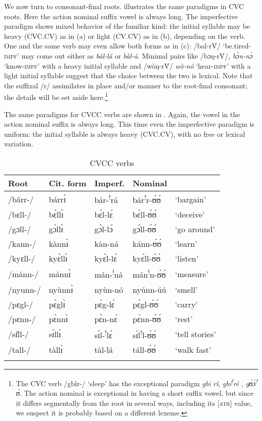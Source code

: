 \documentclass[output=paper
,newtxmath
,modfonts
,nonflat]{langsci/langscibook}
\begin{document}
We now turn to consonant-final roots.  illustrates the same paradigms in CVC roots. Here the action nominal suffix vowel is always long. The imperfective paradigm shows mixed behavior of the familiar kind: the initial syllable may be heavy (CVC.CV) as in (a) or light (CV.CV) as in (b), depending on the verb. One and the same verb may even allow both forms as in (c): /bal-r\'{V}/ ‘be.tired-\textsc{impf’} may come out either as \textit{bàl-lá} or \textit{bàl-á}. Minimal pairs like /bɔŋ{}-r\'{V}/, \textit{bɔ̀n-nɔ́} ‘know-\textsc{impf}’ with a heavy initial syllable and /wòŋ{}-r\'{V}/ \textit{wò-nó} ‘hear-\textsc{impf}’ with a light initial syllable suggest that the choice between the two is lexical. Note that the suffixal /r/ assimilates in place and/or manner to the root-final consonant; the details will be set aside here.\footnote{The CVC verb /gb\^{i}r-/ ‘sleep’ has the exceptional paradigm \textit{gbi }\textit{rì}, \textit{gbí}\textit{\textsuperscript{!}}\textit{ré{} }, \textit{gʊ́ɔ́}\textit{\textsuperscript{!}}\textit{ʊ́}. The action nominal is exceptional in having a short suffix vowel, but since it differs segmentally from the root in several ways, including its [\textsc{atr}] value, we suspect it is probably based on a different lexeme.}
     
     The same paradigms for CVCC verbs are shown in . Again, the vowel in the action nominal suffix is always long.  This time even the imperfective paradigm is uniform: the initial syllable is always heavy (CVC.CV), with no free or lexical variation.

\begin{table}
\begin{tabularx}{\textwidth}{llXXX} 
\lsptoprule
{Root} & {Cit. form} & {Imperf.} & {Nominal} & \\
\midrule
/bârr-/&	bárrɪ̀&	bár-\textsuperscript{!}rá&	bár\textsuperscript{!}r-ʊ́ʊ́&	‘bargain’\\
/bɛll-/&	bɛ̀llɪ̀&	bɛ̀l-lɛ́&	bɛ́ll-ʊ́ʊ́&	‘deceive’\\
/gɔll-/&	gɔ̀llɪ̀&	gɔ̀l-lɔ́&	gɔ́ll-ʊ́ʊ́&	‘go around’\\
/kann-/&	kànnɪ̀&	kàn-ná&	kánn-ʊ́ʊ́&	‘learn’\\
/kyɛll-/&	kyɛ̀llɪ̀&	kyɛ̀l-lɛ́&	kyɛ́ll-ʊ́ʊ́&	‘listen’\\
/mánn-/&	mánnɪ̀&	mán-\textsuperscript{!}ná&	mán\textsuperscript{!}n-ʊ́ʊ́&	‘measure’\\
/nyunn-/&	nyùnnɪ̀&	nyùn-nó&	nyúnn-úú&	‘smell’\\
/pɛgl-/&	pɛ̀glɪ̀&	pɛ̀g-lɛ́&	pɛ́gl-ʊ́ʊ́&	‘carry’\\
/pɛnn-/&	pɛ̀nnɪ̀&	pɛ̀n-nɛ́&	pɛ́nn-ʊ́ʊ́&	‘rest’\\
/sɪ̂ll-/&	sɪ́llɪ̀&	sɪ́l-\textsuperscript{!}lɛ́&	sɪ́l\textsuperscript{!}l-ʊ́ʊ́&	‘tell stories’\\
/tall-/&	tàllɪ̀&	tàl-lá&	táll-ʊ́ʊ́&	‘walk fast’\\
\lspbottomrule
\end{tabularx}
\caption{CVCC verbs}
\label{tab:anttila:10}
\end{table}
\end{document}
